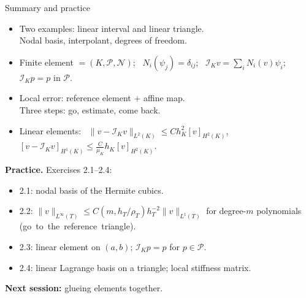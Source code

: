 \begin{frame}{Summary and practice}
    \begin{itemize}
        \item Two examples: linear interval and linear triangle.\\ Nodal basis, interpolant, degrees of freedom.
        \item Finite element $= (K, \mathcal P, \mathcal N)$; \ $N_i(\psi_j) = \delta_{ij}$; \ $\mathcal I_K v = \sum_i N_i(v)\psi_i$; \ $\mathcal I_K p = p$ in $\mathcal P$.
        \item Local error: reference element $+$ affine map.\\ Three steps: go, estimate, come back.
        \item Linear elements: \ $\|v - \mathcal I_K v\|_{L^2(K)} \le C h_K^2 [v]_{H^2(K)}$, \ $[v - \mathcal I_K v]_{H^1(K)} \le \frac{C}{\mu_K} h_K [v]_{H^2(K)}$.
    \end{itemize}
    \bigskip
    \textbf{Practice.} Exercises 2.1--2.4:
    \begin{itemize}
        \item 2.1: nodal basis of the Hermite cubics.
        \item 2.2: $\|v\|_{L^\infty(T)} \le C(m,h_T/\rho_T) h_T^{-2} \|v\|_{L^1(T)}$ for degree-$m$ polynomials \mbox{(go to the reference triangle).}
        \item 2.3: linear element on $(a,b)$; $\mathcal I_K p = p$ for $p \in \mathcal P$.
        \item 2.4: linear Lagrange basis on a triangle; local stiffness matrix.
    \end{itemize}
    \bigskip
    \textbf{Next session:} glueing elements together.
\end{frame}
